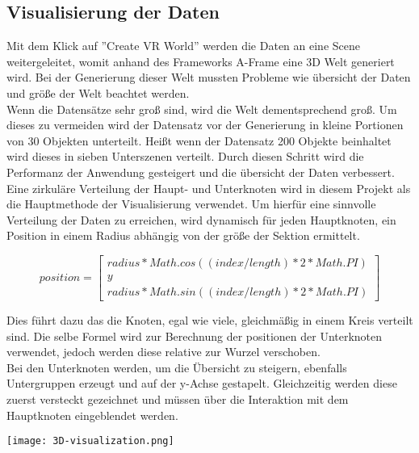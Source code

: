 \newpage
\subsection{Visualisierung der Daten}
Mit dem Klick auf ''Create VR World'' werden die Daten an eine Scene weitergeleitet, womit anhand des Frameworks A-Frame eine 3D Welt
generiert wird. Bei der Generierung dieser Welt mussten Probleme wie übersicht der Daten und größe der Welt beachtet werden. \\
Wenn die Datensätze sehr groß sind, wird die Welt dementsprechend groß. Um dieses zu vermeiden wird der Datensatz vor der Generierung
in kleine Portionen von 30 Objekten unterteilt. Heißt wenn der Datensatz 200 Objekte beinhaltet wird dieses in sieben Unterszenen verteilt.
Durch diesen Schritt wird die Performanz der Anwendung gesteigert und die übersicht der Daten verbessert. \\
Eine zirkuläre Verteilung der Haupt- und Unterknoten wird in diesem Projekt als die Hauptmethode der Visualisierung verwendet. Um hierfür
eine sinnvolle Verteilung der Daten zu erreichen, wird dynamisch für jeden Hauptknoten, ein Position in einem Radius abhängig von der größe
der Sektion ermittelt.
\begin{center}
    \begin{equation*}
        position=
        \begin{bmatrix}
            radius * Math.cos((index / length) * 2 * Math.PI) \\
            y \\
            radius * Math.sin((index / length) * 2 * Math.PI)
        \end{bmatrix}
    \end{equation*}
\end{center}
Dies führt dazu das die Knoten, egal wie viele, gleichmäßig in einem Kreis verteilt sind. Die selbe Formel wird zur Berechnung der
positionen der Unterknoten verwendet, jedoch werden diese relative zur Wurzel verschoben. \\
Bei den Unterknoten werden, um die Übersicht zu steigern, ebenfalls Untergruppen erzeugt und auf der y-Achse gestapelt. Gleichzeitig werden
diese zuerst versteckt gezeichnet und müssen über die Interaktion mit dem Hauptknoten eingeblendet werden.
\begin{center}
    \texttt{[image: 3D-visualization.png]}
\end{center}

\newpage
